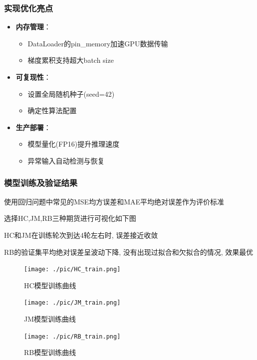 \documentclass[a4paper,11pt]{ctexart}
\begin{document}
\subsubsection{实现优化亮点}
\begin{itemize}
\item \textbf{内存管理}：
  \begin{itemize}
  \item DataLoader的pin\_memory加速GPU数据传输
  \item 梯度累积支持超大batch size
  \end{itemize}
  
\item \textbf{可复现性}：
  \begin{itemize}
  \item 设置全局随机种子(seed=42)
  \item 确定性算法配置
  \end{itemize}
  
\item \textbf{生产部署}：
  \begin{itemize}
  \item 模型量化(FP16)提升推理速度
  \item 异常输入自动检测与恢复
  \end{itemize}
\end{itemize}
\subsubsection{模型训练及验证结果}
使用回归问题中常见的MSE均方误差和MAE平均绝对误差作为评价标准

选择HC,JM,RB三种期货进行可视化如下图

HC和JM在训练轮次到达4轮左右时, 误差接近收敛

RB的验证集平均绝对误差呈波动下降, 没有出现过拟合和欠拟合的情况, 效果最优
\FloatBarrier
\noindent
\begin{figure}[H]
  \centering
  \texttt{[image: ./pic/HC\_train.png]}
  \caption*{HC模型训练曲线}
\end{figure}
\begin{figure}[H]
  \centering
  \texttt{[image: ./pic/JM\_train.png]}
  \caption*{JM模型训练曲线}
\end{figure}
\begin{figure}[H]
  \centering
  \texttt{[image: ./pic/RB\_train.png]}
  \caption*{RB模型训练曲线}
\end{figure}
\end{document}
